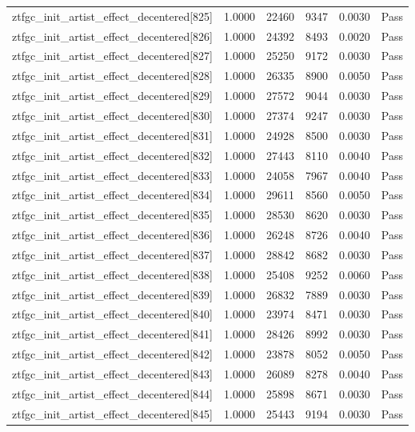 \begin{table}[htbp]
\begin{tabular}{llrrll}
ztfgc\_init\_artist\_effect\_decentered[825] & 1.0000 & 22460 & 9347 & 0.0030 & Pass \\
ztfgc\_init\_artist\_effect\_decentered[826] & 1.0000 & 24392 & 8493 & 0.0020 & Pass \\
ztfgc\_init\_artist\_effect\_decentered[827] & 1.0000 & 25250 & 9172 & 0.0030 & Pass \\
ztfgc\_init\_artist\_effect\_decentered[828] & 1.0000 & 26335 & 8900 & 0.0050 & Pass \\
ztfgc\_init\_artist\_effect\_decentered[829] & 1.0000 & 27572 & 9044 & 0.0030 & Pass \\
ztfgc\_init\_artist\_effect\_decentered[830] & 1.0000 & 27374 & 9247 & 0.0030 & Pass \\
ztfgc\_init\_artist\_effect\_decentered[831] & 1.0000 & 24928 & 8500 & 0.0030 & Pass \\
ztfgc\_init\_artist\_effect\_decentered[832] & 1.0000 & 27443 & 8110 & 0.0040 & Pass \\
ztfgc\_init\_artist\_effect\_decentered[833] & 1.0000 & 24058 & 7967 & 0.0040 & Pass \\
ztfgc\_init\_artist\_effect\_decentered[834] & 1.0000 & 29611 & 8560 & 0.0050 & Pass \\
ztfgc\_init\_artist\_effect\_decentered[835] & 1.0000 & 28530 & 8620 & 0.0030 & Pass \\
ztfgc\_init\_artist\_effect\_decentered[836] & 1.0000 & 26248 & 8726 & 0.0040 & Pass \\
ztfgc\_init\_artist\_effect\_decentered[837] & 1.0000 & 28842 & 8682 & 0.0030 & Pass \\
ztfgc\_init\_artist\_effect\_decentered[838] & 1.0000 & 25408 & 9252 & 0.0060 & Pass \\
ztfgc\_init\_artist\_effect\_decentered[839] & 1.0000 & 26832 & 7889 & 0.0030 & Pass \\
ztfgc\_init\_artist\_effect\_decentered[840] & 1.0000 & 23974 & 8471 & 0.0030 & Pass \\
ztfgc\_init\_artist\_effect\_decentered[841] & 1.0000 & 28426 & 8992 & 0.0030 & Pass \\
ztfgc\_init\_artist\_effect\_decentered[842] & 1.0000 & 23878 & 8052 & 0.0050 & Pass \\
ztfgc\_init\_artist\_effect\_decentered[843] & 1.0000 & 26089 & 8278 & 0.0040 & Pass \\
ztfgc\_init\_artist\_effect\_decentered[844] & 1.0000 & 25898 & 8671 & 0.0030 & Pass \\
ztfgc\_init\_artist\_effect\_decentered[845] & 1.0000 & 25443 & 9194 & 0.0030 & Pass \\

\end{tabular}
\end{table}
